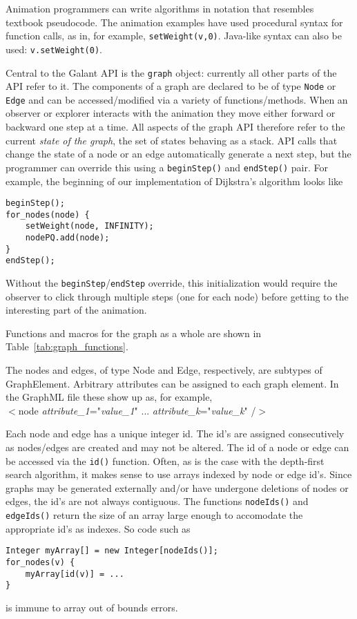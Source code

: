 
Animation programmers can write algorithms in notation that resembles
textbook pseudocode.
The animation examples have used procedural syntax for function calls, as in, for example,
\texttt{setWeight(v,0)}.
Java-like syntax can also be used: \texttt{v.setWeight(0)}.

Central to the Galant API is the \texttt{graph} object: currently all other
parts of the API refer to it.
The components of a graph are declared to be of type \texttt{Node} or
\texttt{Edge} and can be accessed/modified via a variety of
functions/methods.
When an observer or explorer interacts with the animation they move either
forward or backward one step at a time.
All aspects of the graph API therefore refer to the current \emph{state of
  the graph}, the set of states behaving as a stack.
API calls that change the state of a node or an edge automatically
generate a next step,
but the programmer can override this using a \texttt{beginStep()} and
\texttt{endStep()} pair. For example, the beginning of our implementation of
Dijkstra's algorithm looks like
\begin{verbatim}
beginStep();
for_nodes(node) {
    setWeight(node, INFINITY);
    nodePQ.add(node);
}
endStep();
\end{verbatim}
Without the \texttt{beginStep}/\texttt{endStep}
override, this initialization would require the observer to click
through multiple steps (one for each node) before getting to the interesting
part of the animation.



Functions and macros for the graph as a whole are shown in Table~\ref{tab:graph_functions}.

The nodes and edges, of type \textsf{Node} and \textsf{Edge}, respectively,
are subtypes of \textsf{GraphElement}.
Arbitrary attributes can be assigned to each graph element. In the GraphML file
these show up as, for example,\\
\hspace*{3em}
\textsf{
$<$node \emph{attribute\_1}="\emph{value\_1}" ... \emph{attribute\_k}="\emph{value\_k}" /$>$
}

Each node and edge has a unique integer id.
The id's are assigned consecutively as nodes/edges are created
and may not be altered.
The id of a node or edge can be accessed via the \texttt{id()} function.
Often, as is the case with the depth-first search algorithm, it makes sense to use
arrays indexed by node or edge id's.
Since graphs may be generated externally and/or have undergone deletions of nodes or
edges, the id's are not always contiguous.
The functions \texttt{nodeIds()} and \texttt{edgeIds()} return the size of an array
large enough to accomodate the appropriate id's as indexes. So code such as
\begin{verbatim}
Integer myArray[] = new Integer[nodeIds()];
for_nodes(v) {
    myArray[id(v)] = ...
}
\end{verbatim}
is immune to array out of bounds errors.

